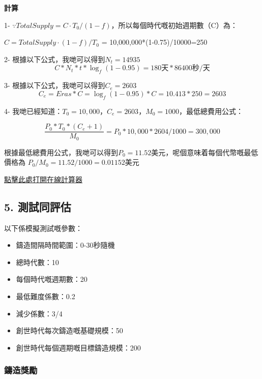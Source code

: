 \documentclass[
]{article}
\providecommand{\tightlist}{%
  \setlength{\itemsep}{0pt}\setlength{\parskip}{0pt}}
\begin{document}
\textbf{計算}

1-
\(\because TotalSupply = C \cdot T_0 / (1-f)\)，所以每個時代嘅初始週期數（C）為：

\(C = TotalSupply \cdot (1 - f) / T_0\) = 10,000,000*(1-0.75)/10000=250

2- 根據以下公式，我哋可以得到\(N_t = 14935\) \begin{equation}
C * N_t * t * \log_f(1-0.95) = 180天 * 86400秒/天
\end{equation}

3- 根據以下公式，我哋可以得到\(C_e = 2603\) \begin{equation}
C_e = Eras * C = \log_f(1-0.95) * C = 10.413 * 250 = 2603
\end{equation}

4-
我哋已經知道：\(T_0=10,000\)，\(C_e=2603\)，\(M_0=1000\)，最低總費用公式：

\begin{equation}
\frac{P_0 * T_0 * (C_e+1)}{M_0} = P_0 * 10,000 * 2604 / 1000 = 300,000
\end{equation}

根據最低總費用公式，我哋可以得到\(P_0 = 11.52\)美元，呢個意味着每個代幣嘅最低價格為
\(P_0 / M_0 = 11.52 / 1000 = 0.01152\)美元

\href{https://docs.google.com/spreadsheets/d/1z4eO1k14noxTMcgADMc-I0xFXT0giMFPSBEGal4suvI/edit?usp=sharing}{點擊此處打開在線計算器}

\subsection{5. 測試同評估}\label{ux6e2cux8a66ux540cux8a55ux4f30}

以下係模擬測試嘅參數：

\begin{itemize}
\tightlist
\item
  鑄造間隔時間範圍：0-30秒隨機
\item
  總時代數：10
\item
  每個時代嘅週期數：20
\item
  最低難度係數：0.2
\item
  減少係數：3/4
\item
  創世時代每次鑄造嘅基礎規模：50
\item
  創世時代每個週期嘅目標鑄造規模：200
\end{itemize}

\subsubsection{鑄造獎勵}\label{ux9444ux9020ux734eux52f5}
\end{document}

